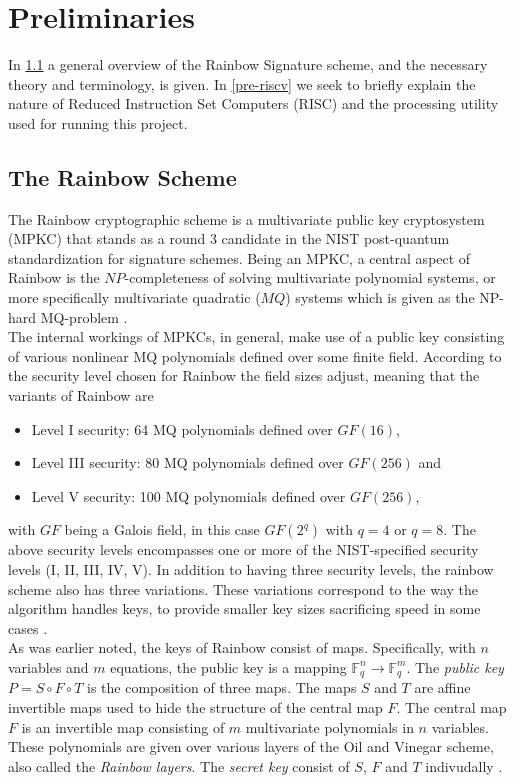 \section{Preliminaries}
In \cref{rainscheme} a general overview of the Rainbow Signature scheme, and the necessary theory and terminology, is given. In \cref{pre-riscv} we seek to briefly explain the nature of Reduced Instruction Set Computers (RISC) and the processing utility used for running this project.
\subsection{The Rainbow Scheme} \label{rainscheme}
The Rainbow cryptographic scheme is a multivariate public key cryptosystem (MPKC) that stands as a round 3 candidate in the NIST post-quantum standardization for signature schemes. Being an MPKC, a central aspect of Rainbow is the $NP$-completeness of solving multivariate polynomial systems, or more specifically multivariate quadratic ($MQ$) systems which is given as the NP-hard MQ-problem \cite{multicrypto}. 
\medskip\\
The internal workings of MPKCs, in general, make use of a public key consisting of various nonlinear MQ polynomials defined over some finite field. According to the security level chosen for Rainbow the field sizes adjust, meaning that the variants of Rainbow are 
\begin{itemize}
    \item Level I security: 64 MQ polynomials defined over $GF(16)$,
    \item Level III security: 80 MQ polynomials defined over $GF(256)$ and
    \item Level V security: 100 MQ polynomials defined over $GF(256)$,
\end{itemize}
with $GF$ being a Galois field, in this case $GF(2^q)$ with $q = 4$ or $q=8$. The above security levels encompasses one or more of the NIST-specified security levels (I, II, III, IV, V). In addition to having three security levels, the rainbow scheme also has three variations. These variations correspond to the way the algorithm handles keys, to provide smaller key sizes sacrificing speed in some cases \cite{rainbownist}.
\medskip\\
As was earlier noted, the keys of Rainbow consist of maps. Specifically, with $n$ variables and $m$ equations, the public key is a mapping $\mathbb{F}_q^n \rightarrow \mathbb{F}_q^m$. The \textit{public key} $P = S \circ F \circ T$ is the composition of three maps. The maps $S$ and $T$ are affine invertible maps used to hide the structure of the central map $F$. The central map $F$ is an invertible map consisting of $m$ multivariate polynomials in $n$ variables. These polynomials are given over various layers of the Oil and Vinegar scheme, also called the \textit{Rainbow layers}. The \textit{secret key} consist of $S$, $F$ and $T$ indivudally \cite{multicrypto}.
